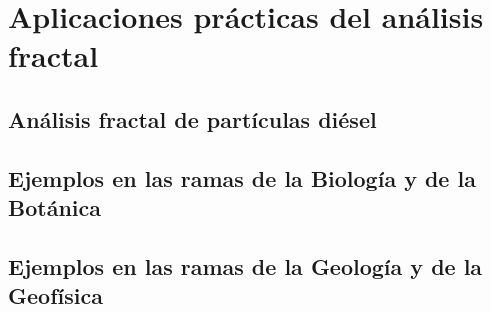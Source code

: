 \section{Aplicaciones prácticas del análisis fractal}
\subsection{Análisis fractal de partículas diésel}
\subsection{Ejemplos en las ramas de la Biología y de la Botánica}
\subsection{Ejemplos en las ramas de la Geología y de la Geofísica}


\newpage
	
